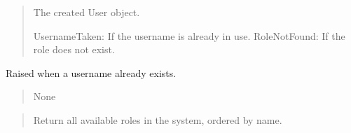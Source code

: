 \documentclass[a4paper,11pt,spanish]{sphinxmanual}
\begin{document}
\begin{fulllineitems}
\begin{quote}
\begin{description}
\begin{itemize}
\end{itemize}

\sphinxAtStartPar
The created User object.

\sphinxAtStartPar
UsernameTaken: If the username is already in use.
RoleNotFound: If the role does not exist.

\sphinxAtStartPar
{}

\end{description}\end{quote}

\end{fulllineitems}


\begin{fulllineitems}
\label{\detokenize{api/users/users.services:users.services.ensure_default_roles}}
\pysigstartsignatures
\pysiglinewithargsret
{}
{}
{}
\pysigstopsignatures
\sphinxAtStartPar
Raised when a username already exists.
\begin{quote}\begin{description}
\sphinxAtStartPar
None

\end{description}\end{quote}

\end{fulllineitems}


\begin{fulllineitems}
\label{\detokenize{api/users/users.services:users.services.list_roles}}
\pysigstartsignatures
\pysiglinewithargsret
{}
{}
{}
\pysigstopsignatures\begin{quote}\begin{description}
\sphinxAtStartPar
Return all available roles in the system, ordered by name.

\sphinxAtStartPar
\sphinxstyleemphasis{Iterable}{[}\sphinxstyleemphasis{Group}{]}

\end{description}\end{quote}

\end{fulllineitems}
\end{document}
